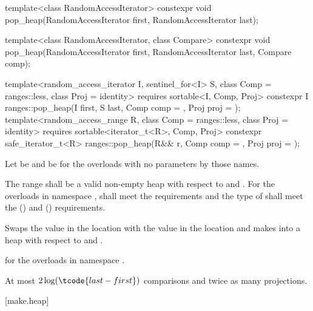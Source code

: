 %
\begin{itemdecl}
template<class RandomAccessIterator>
  constexpr void pop_heap(RandomAccessIterator first, RandomAccessIterator last);

template<class RandomAccessIterator, class Compare>
  constexpr void pop_heap(RandomAccessIterator first, RandomAccessIterator last,
                          Compare comp);

template<random_access_iterator I, sentinel_for<I> S, class Comp = ranges::less,
         class Proj = identity>
  requires sortable<I, Comp, Proj>
  constexpr I
    ranges::pop_heap(I first, S last, Comp comp = {}, Proj proj = {});
template<random_access_range R, class Comp = ranges::less, class Proj = identity>
  requires sortable<iterator_t<R>, Comp, Proj>
  constexpr safe_iterator_t<R>
    ranges::pop_heap(R&& r, Comp comp = {}, Proj proj = {});
\end{itemdecl}

\begin{itemdescr}
\pnum
Let  be 
and  be 
for the overloads with no parameters by those names.

\pnum
\requires
The range 
shall be a valid non-empty heap with respect to  and .
For the overloads in namespace ,
 shall meet
the  requirements and
the type of  shall meet
the  () and
 () requirements.

\pnum
\effects
Swaps the value in the location 
with the value in the location
and makes
into a heap with respect to  and .

\pnum
\returns
{} for the overloads in namespace .

\pnum
\complexity
At most $2 \log(\tcode{last - first})$ comparisons and
twice as many projections.
\end{itemdescr}

[make.heap]{}

